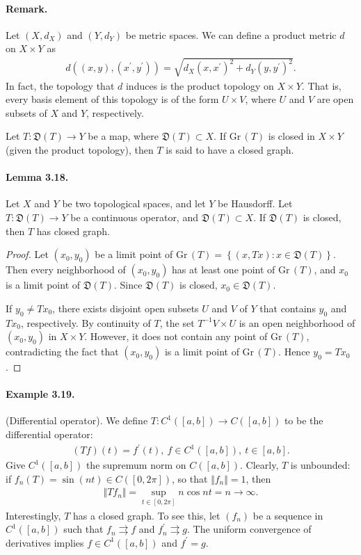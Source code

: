\documentclass{article}
\newcommand{\Gr}{\mathrm{Gr}\,}
\begin{document}
\paragraph{Remark.} Let $(X,d_X)$ and $(Y,d_Y)$ be metric spaces. We can define a product metric $d$ on $X\times Y$ as
\begin{align*}
	d((x,y),(x^\prime,y^\prime)) = \sqrt{d_X(x,x^\prime)^2 + d_Y(y,y^\prime)^2}.
\end{align*}
In fact, the topology that $d$ induces is the product topology on $X\times Y$. That is, every basis element of this topology is of the form $U\times V$, where $U$ and $V$ are open subsets of $X$ and $Y$, respectively.

Let $T:\mathfrak{D}(T)\to Y$ be a map, where $\mathfrak{D}(T)\subset X$. If $\Gr(T)$ is closed in $X\times Y$ (given the product topology), then $T$ is said to have a closed graph.

\paragraph{Lemma 3.18.\label{lemma:3.18}} Let $X$ and $Y$ be two topological spaces, and let $Y$ be Hausdorff. Let $T:\mathfrak{D}(T)\to Y$ be a continuous operator, and $\mathfrak{D}(T)\subset X$. If $\mathfrak{D}(T)$ is closed, then $T$ has closed graph.
\begin{proof}
Let $(x_0,y_0)$ be a limit point of $\Gr(T)=\left\{(x,Tx):x\in\mathfrak{D}(T)\right\}$. Then every neighborhood of $(x_0,y_0)$ has at least one point of $\Gr(T)$, and $x_0$ is a limit point of $\mathfrak{D}(T)$. Since $\mathfrak{D}(T)$ is closed, $x_0\in\mathfrak{D}(T)$.

If $y_0\neq Tx_0$, there exists disjoint open subsets $U$ and $V$ of $Y$ that contains $y_0$ and $Tx_0$, respectively. By continuity of $T$, the set $T^{-1}V\times U$ is an open neighborhood of $(x_0,y_0)$ in $X\times Y$. However, it does not contain any point of $\Gr(T)$, contradicting the fact that $(x_0,y_0)$ is a limit point of $\Gr(T)$. Hence $y_0=Tx_0$.
\end{proof}

\paragraph{Example 3.19.} (Differential operator). We define $T:C^1([a,b])\to C([a,b])$ to be the differential operator:
\begin{align*}
	(Tf)(t) = f^\prime(t),\ f\in C^1([a,b]),\ t\in[a,b].
\end{align*}
Give $C^1([a,b])$ the supremum norm on $C([a,b])$. Clearly, $T$ is unbounded: if $f_n(T)=\sin(nt)\in C([0,2\pi])$, so that $\Vert f_n\Vert=1$, then
\begin{align*}
	\Vert Tf_n\Vert = \sup_{t\in[0,2\pi]} n\cos nt = n\to\infty.
\end{align*}
Interestingly, $T$ has a closed graph. To see this, let $(f_n)$ be a sequence in $C^1([a,b])$ such that $f_n\rightrightarrows f$ and $f_n^\prime\rightrightarrows g$. The uniform convergence of derivatives implies $f\in C^1([a,b])$ and $f^\prime = g$.
\end{document}
